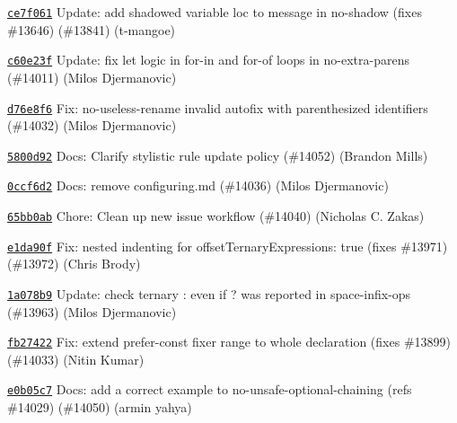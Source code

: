 \begin{DoxyItemize}
\item \href{https://github.com/eslint/eslint/commit/ce7f06121d9eb9cc2b3da24b4456b4d382e1413b}{\texttt{ {\ttfamily ce7f061}}} Update\+: add shadowed variable loc to message in no-\/shadow (fixes \#13646) (\#13841) (t-\/mangoe)
\item \href{https://github.com/eslint/eslint/commit/c60e23ff306a14ca6eabcadb275ed27995fcc6e4}{\texttt{ {\ttfamily c60e23f}}} Update\+: fix {\ttfamily let} logic in for-\/in and for-\/of loops in no-\/extra-\/parens (\#14011) (Milos Djermanovic)
\item \href{https://github.com/eslint/eslint/commit/d76e8f69bd791357c67ada7b5c55608acf29b622}{\texttt{ {\ttfamily d76e8f6}}} Fix\+: no-\/useless-\/rename invalid autofix with parenthesized identifiers (\#14032) (Milos Djermanovic)
\item \href{https://github.com/eslint/eslint/commit/5800d921144ec330b6ee7cd03364434007331354}{\texttt{ {\ttfamily 5800d92}}} Docs\+: Clarify stylistic rule update policy (\#14052) (Brandon Mills)
\item \href{https://github.com/eslint/eslint/commit/0ccf6d200147437b338cadb34546451972befd75}{\texttt{ {\ttfamily 0ccf6d2}}} Docs\+: remove configuring.\+md (\#14036) (Milos Djermanovic)
\item \href{https://github.com/eslint/eslint/commit/65bb0abde56f72586036fff151aa2d13f1b7be6c}{\texttt{ {\ttfamily 65bb0ab}}} Chore\+: Clean up new issue workflow (\#14040) (Nicholas C. Zakas)
\item \href{https://github.com/eslint/eslint/commit/e1da90fc414a3c9c16f52db4a5bd81bd4f9532a4}{\texttt{ {\ttfamily e1da90f}}} Fix\+: nested indenting for offset\+Ternary\+Expressions\+: true (fixes \#13971) (\#13972) (Chris Brody)
\item \href{https://github.com/eslint/eslint/commit/1a078b9166f29cb3760435ddbc1a0da4a0974d4a}{\texttt{ {\ttfamily 1a078b9}}} Update\+: check ternary {\ttfamily \+:} even if {\ttfamily ?} was reported in space-\/infix-\/ops (\#13963) (Milos Djermanovic)
\item \href{https://github.com/eslint/eslint/commit/fb274226242eaebc1480fc9c901202986afc3c8a}{\texttt{ {\ttfamily fb27422}}} Fix\+: extend prefer-\/const fixer range to whole declaration (fixes \#13899) (\#14033) (Nitin Kumar)
\item \href{https://github.com/eslint/eslint/commit/e0b05c704f3ce6f549d14718236d22fe49fcb611}{\texttt{ {\ttfamily e0b05c7}}} Docs\+: add a correct example to no-\/unsafe-\/optional-\/chaining (refs \#14029) (\#14050) (armin yahya)

\end{DoxyItemize}
